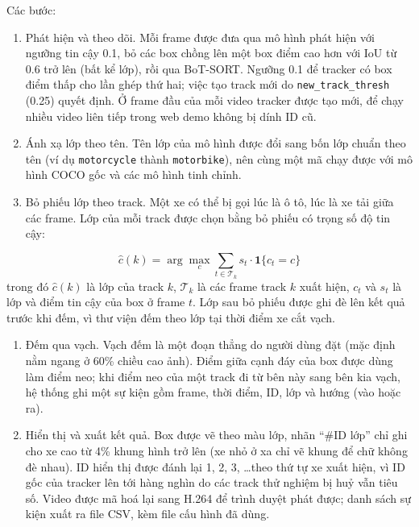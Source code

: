 Các bước:
\begin{enumerate}
  \item Phát hiện và theo dõi. Mỗi frame được đưa qua mô hình phát hiện với ngưỡng tin cậy 0.1, bỏ các box
        chồng lên một box điểm cao hơn với IoU từ 0.6 trở lên (bất kể lớp), rồi qua BoT-SORT.
        Ngưỡng 0.1 để tracker có box điểm thấp cho lần ghép thứ hai; việc tạo track mới do \texttt{new\_track\_thresh}
        (0.25) quyết định. Ở frame đầu của mỗi video tracker được tạo mới, để chạy nhiều video liên tiếp trong web demo
        không bị dính ID cũ.
  \item Ánh xạ lớp theo tên. Tên lớp của mô hình được đổi sang bốn lớp chuẩn theo tên (ví dụ
        \texttt{motorcycle} thành \texttt{motorbike}), nên cùng một mã chạy được với mô hình COCO gốc và các mô hình
        tinh chỉnh.
  \item Bỏ phiếu lớp theo track. Một xe có thể bị gọi lúc là ô tô, lúc là xe tải giữa các frame. Lớp của mỗi
        track được chọn bằng bỏ phiếu có trọng số độ tin cậy:
\end{enumerate}
\begin{equation}
  \hat{c}(k) = \arg\max_{c} \sum_{t \in \mathcal{T}_k} s_t \cdot \mathbf{1}\{c_t = c\}
  \label{eq:vote}
\end{equation}
trong đó $\hat{c}(k)$ là lớp của track $k$, $\mathcal{T}_k$ là các frame track $k$ xuất hiện, $c_t$ và $s_t$ là
lớp và điểm tin cậy của box ở frame $t$. Lớp sau bỏ phiếu được ghi đè lên kết quả trước khi đếm, vì thư viện đếm theo lớp
tại thời điểm xe cắt vạch.
\begin{enumerate}[resume]
  \item Đếm qua vạch. Vạch đếm là một đoạn thẳng do người dùng đặt (mặc định nằm ngang ở 60\% chiều cao ảnh).
        Điểm giữa cạnh đáy của box được dùng làm điểm neo; khi điểm neo của một track đi từ bên này sang bên kia vạch,
        hệ thống ghi một sự kiện gồm frame, thời điểm, ID, lớp và hướng (vào hoặc ra).
  \item Hiển thị và xuất kết quả. Box được vẽ theo màu lớp, nhãn ``\#ID lớp'' chỉ ghi cho xe cao từ 4\% khung
        hình trở lên (xe nhỏ ở xa chỉ vẽ khung để chữ không đè nhau). ID hiển thị được đánh lại 1, 2, 3, \ldots theo thứ
        tự xe xuất hiện, vì ID gốc của tracker lên tới hàng nghìn do các track thử nghiệm bị huỷ vẫn tiêu số. Video được
        mã hoá lại sang H.264 để trình duyệt phát được; danh sách sự kiện xuất ra file CSV, kèm file cấu hình đã dùng.
\end{enumerate}

